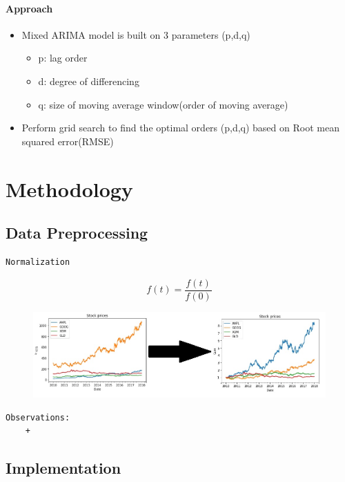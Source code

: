 \documentclass[11pt]{article}
\makeatletter
\def\maxwidth{\ifdim\Gin@nat@width>\linewidth\linewidth
    \else\Gin@nat@width\fi}
\let\Oldincludegraphics\includegraphics
\renewcommand{\includegraphics}[1]{\Oldincludegraphics[width=.8\maxwidth]{#1}}
\providecommand{\tightlist}{%
      \setlength{\itemsep}{0pt}\setlength{\parskip}{0pt}}
\makeatother
\begin{document}
\paragraph{Approach}\label{approach}

\begin{itemize}
\tightlist
\item
  Mixed ARIMA model is built on 3 parameters (p,d,q)

  \begin{itemize}
  \tightlist
  \item
    p: lag order
  \item
    d: degree of differencing
  \item
    q: size of moving average window(order of moving average)
  \end{itemize}
\item
  Perform grid search to find the optimal orders (p,d,q) based on Root
  mean squared error(RMSE)
\end{itemize}

\section{Methodology}\label{methodology}

\subsection{Data Preprocessing}\label{data-preprocessing}

\begin{verbatim}
Normalization
\end{verbatim}

\[f(t) = \frac{f(t)}{f(0)}\]

\begin{figure}
\centering
\includegraphics{./figures/13.jpg}
\caption{}
\end{figure}

\begin{verbatim}
Observations:
    +
\end{verbatim}

\subsection{Implementation}\label{implementation}
\end{document}

